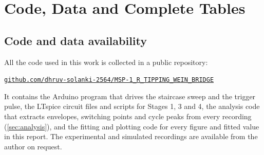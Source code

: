 \chapter{Code, Data and Complete Tables}\label{app:code}

\section{Code and data availability}

All the code used in this work is collected in a public repository:
\begin{center}
  \small\href{\repourl}{\nolinkurl{github.com/dhruv-solanki-2564/MSP-1_R_TIPPING_WEIN_BRIDGE}}
\end{center}
It contains the Arduino program that drives the staircase sweep and the trigger pulse, the LTspice
circuit files and scripts for Stages 1, 3 and 4, the analysis code that extracts envelopes, switching
points and cycle peaks from every recording (\cref{sec:analysis}), and the fitting and plotting code for
every figure and fitted value in this report.
The experimental and simulated recordings are available from the author on request.

